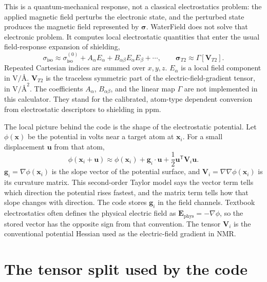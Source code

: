 \documentclass[11pt]{article}
\begin{document}
This is a quantum-mechanical response, not a classical electrostatics problem:
the applied magnetic field perturbs the electronic state, and the perturbed
state produces the magnetic field represented by \(\bm\sigma\). WaterField
does not solve that electronic problem. It computes local electrostatic
quantities that enter the usual field-response expansion of shielding,
\begin{equation}
  \sigma_{\mathrm{iso}}
    \approx \sigma_{\mathrm{iso}}^{(0)}
      + A_\alpha E_\alpha
      + B_{\alpha\beta}E_\alpha E_\beta+\cdots,
  \qquad
  \bm\sigma_{T2} \approx \Gamma[\bm V_{T2}] .
  \label{eq:buckingham-context}
\end{equation}
Repeated Cartesian indices are summed over \(x,y,z\). \(E_\alpha\) is a local
field component in \(\si{\volt\per\angstrom}\). \(\bm V_{T2}\) is the
traceless symmetric part of the electric-field-gradient tensor, in
\(\si{\volt\per\square\angstrom}\). The coefficients
\(A_\alpha\), \(B_{\alpha\beta}\), and the linear map \(\Gamma\) are not
implemented in this calculator. They stand for the calibrated, atom-type
dependent conversion from electrostatic descriptors to shielding in ppm.

The local picture behind the code is the shape of the electrostatic
potential. Let \(\phi(\bm x)\) be the potential in volts near a target atom at
\(\bm x_i\). For a small displacement \(\bm u\) from that atom,
\begin{equation}
  \phi(\bm x_i+\bm u)
   \approx \phi(\bm x_i)
      + \bm g_i\cdot\bm u
      + \frac{1}{2}\bm u^{\mathsf T}\bm V_i\bm u .
  \label{eq:taylor}
\end{equation}
\(\bm g_i=\nabla\phi(\bm x_i)\) is the slope vector of the potential surface,
and \(\bm V_i=\nabla\nabla\phi(\bm x_i)\) is its curvature matrix. This
second-order Taylor model says the vector term tells which direction the
potential rises fastest, and the matrix term tells how that slope changes with
direction. The code stores \(\bm g_i\) in the field channels. Textbook
electrostatics often defines the physical electric field as
\(\bm E_{\mathrm{phys}}=-\nabla\phi\), so the stored vector has the opposite
sign from that convention. The tensor \(\bm V_i\) is the conventional
potential Hessian used as the electric-field gradient in NMR.

\section{The tensor split used by the code}
\end{document}
